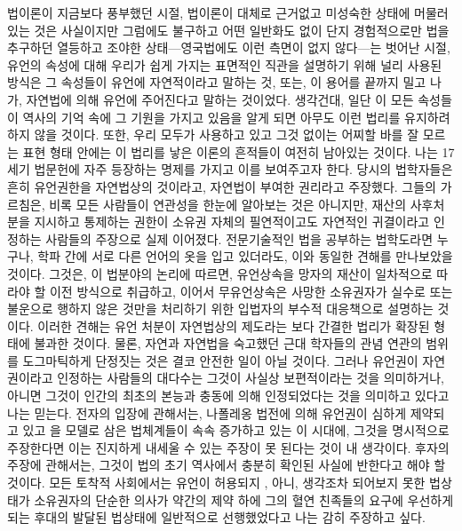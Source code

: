 법이론이 지금보다 풍부했던 시절,
법이론이 대체로 근거없고 미성숙한 상태에 머물러 있는 것은 사실이지만
그럼에도 불구하고 어떤 일반화도 없이 단지
경험적으로만 법을 추구하던 열등하고 조야한
상태---영국법에도 이런 측면이 없지 않다---는 벗어난 시절,
유언의 속성에 대해 우리가 쉽게 가지는 표면적인 직관을 설명하기 위해
널리 사용된 방식은
그 속성들이 유언에 자연적이라고 말하는 것,
또는, 이 용어를 끝까지 밀고 나가,
자연법에 의해 유언에 주어진다고 말하는 것이었다.
생각건대,
일단 이 모든 속성들이
역사의 기억 속에 그 기원을 가지고 있음을 알게 되면
아무도 이런 법리를 유지하려 하지 않을 것이다.
또한,
우리 모두가 사용하고 있고
그것 없이는 어찌할 바를 잘 모르는 표현 형태 안에는
이 법리를 낳은 이론의 흔적들이
여전히 남아있는 것이다.
나는 17세기 법문헌에 자주 등장하는 명제를 가지고 이를 보여주고자 한다.
당시의 법학자들은 흔히 유언권한을 자연법상의 것이라고,
자연법이 부여한 권리라고 주장했다.
그들의 가르침은,
비록 모든 사람들이 연관성을 한눈에 알아보는 것은 아니지만,
재산의 사후처분을 지시하고 통제하는 권한이
소유권 자체의 필연적이고도 자연적인 귀결이라고
인정하는 사람들의 주장으로 실제 이어졌다.
전문기술적인 법을 공부하는 법학도라면 누구나,
학파 간에 서로 다른 언어의 옷을 입고 있더라도,
이와 동일한 견해를 만나보았을 것이다.
그것은, 이 법분야의 논리에 따르면,
%
유언상속을
망자의 재산이 일차적으로 따라야 할 이전 방식으로 취급하고,
%
이어서 무유언상속은
사망한 소유권자가 실수로 또는 불운으로
행하지 않은 것만을 처리하기 위한 입법자의 부수적 대응책으로
설명하는 것이다.
이러한 견해는 유언 처분이 자연법상의 제도라는 보다 간결한 법리가 확장된
형태에 불과한 것이다.
물론, 자연과 자연법을 숙고했던 근대 학자들의 관념 연관의 범위를
도그마틱하게 단정짓는 것은 결코 안전한 일이 아닐 것이다.
그러나 유언권이 자연권이라고 인정하는 사람들의 대다수는
그것이 사실상 보편적이라는 것을 의미하거나, 아니면
그것이 인간의 최초의 본능과 충동에 의해 인정되었다는 것을 의미하고 있다고
나는 믿는다.
전자의 입장에 관해서는,
나폴레옹 법전에 의해 유언권이 심하게 제약되고 있고
을 모델로 삼은 법체계들이 속속 증가하고 있는 이 시대에,
그것을 명시적으로 주장한다면
이는 진지하게 내세울 수 있는 주장이 못 된다는 것이 내 생각이다.
후자의 주장에 관해서는,
그것이 법의 초기 역사에서 충분히 확인된 사실에 반한다고 해야 할 것이다.
모든 토착적 사회에서는 유언이 허용되지 ,
아니, 생각조차 되어보지 못한 법상태가
소유권자의 단순한 의사가 약간의 제약 하에
그의 혈연 친족들의 요구에 우선하게 되는 후대의 발달된 법상태에
일반적으로 선행했었다고
나는 감히 주장하고 싶다.

